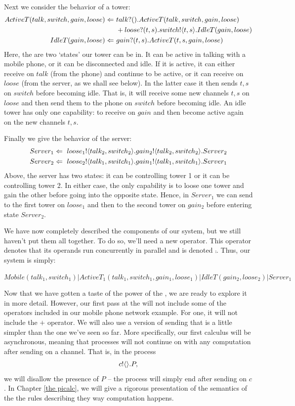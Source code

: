 	Next we consider the behavior of a tower:
	\begin{align*}
		ActiveT(talk,switch,gain,loose) \Leftarrow\  & {talk}?({}).ActiveT(talk,switch,gain,loose) \\  
		 & +{loose}?({t,s}).{switch}!\langle{t,s}\rangle.IdleT(gain, loose)\\
		IdleT(gain,loose) \Leftarrow\  & {gain}?({t,s}).ActiveT(t,s,gain,loose)\\
	\end{align*}
Here, the are two `states' our tower can be in.  It can be active in talking with a mobile phone, or it can be disconnected and idle.  If it is active, it can either receive on $talk$ (from the phone) and continue to be active, or it can receive on $loose$ (from the server, as we shall see below).  In the latter case it then sends $t,s$ on $switch$ before becoming idle.  That is, it will receive some new channels $t,s$ on $loose$ and then send them to the phone on $switch$ before becoming idle.  An idle tower has only one capability: to receive on $gain$ and then become active again on the new channels $t,s$.

Finally we give the behavior of the server:
\begin{align*}
	Server_1 \Leftarrow\  {loose_1}!\langle{talk_2,switch_2}\rangle. {gain_2}!\langle{talk_2,switch_2}\rangle. Server_2\\
	Server_2 \Leftarrow\  {loose_2}!\langle{talk_1,switch_1}\rangle. {gain_1}!\langle{talk_1,switch_1}\rangle. Server_1
\end{align*}
Above, the server has two states: it can be controlling tower 1 or it can be controlling tower 2.  In either case, the only capability is to loose one tower and gain the other before going into the opposite state.  Hence, in $Server_1$ we can send to the first tower on $loose_1$ and then to the second tower on $gain_2$ before entering state $Server_2$.

We have now completely described the components of our system, but we still haven't put them all together.  To do so, we'll need a new operator.  This operator denotes that its operands run concurrently in parallel and is denoted $\comp$.  Thus, our system is simply:
\begin{center}
	\small{$\textstyle Mobile(talk_1,switch_1)|ActiveT_1(talk_1,switch_1,gain_1,loose_1)|IdleT(gain_2,loose_2)|Server_1$}
\end{center}

	Now that we have gotten a taste of the power of the \picalc, we are ready to explore it in more detail.  However, our first pass at the \picalc will not include some of the operators included in our mobile phone network example.  For one, it will not include the $+$ operator.  We will also use a version of sending that is a little simpler than the one we've seen so far.  More specifically, our first calculus will be asynchronous, meaning that processes will not continue on with any computation after sending on a channel.  That is, in the process
\[
	{c}!\langle{}\rangle.P,
\]
we will disallow the presence of $P$ -- the process will simply end after sending on $c$.  In Chapter \ref{the picalc}, we will give a rigorous presentation of the semantics of the \picalc the rules describing they way computation happens.


